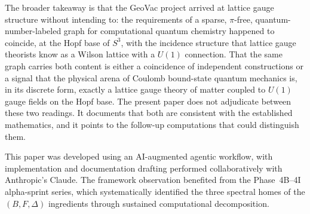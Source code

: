 \documentclass[aps,pra,twocolumn,superscriptaddress,longbibliography]{revtex4-2}
\begin{document}
The broader takeaway is that the GeoVac project arrived at
lattice gauge structure without intending to: the requirements of a
sparse, $\pi$-free, quantum-number-labeled graph for computational
quantum chemistry happened to coincide, at the Hopf base of $S^3$,
with the incidence structure that lattice gauge theorists know as a
Wilson lattice with a $U(1)$ connection.  That the same graph
carries both content is either a coincidence of independent
constructions or a signal that the physical arena of Coulomb
bound-state quantum mechanics is, in its discrete form, exactly a
lattice gauge theory of matter coupled to $U(1)$ gauge fields on
the Hopf base.  The present paper does not adjudicate between these
two readings.  It documents that both are consistent with the
established mathematics, and it points to the follow-up computations
that could distinguish them.


\begin{acknowledgments}
This paper was developed using an AI-augmented agentic workflow, with
implementation and documentation drafting performed collaboratively
with Anthropic's Claude.  The framework observation benefited from
the Phase~4B--4I alpha-sprint series, which systematically identified
the three spectral homes of the $(B, F, \Delta)$ ingredients through
sustained computational decomposition.
\end{acknowledgments}

\end{document}
